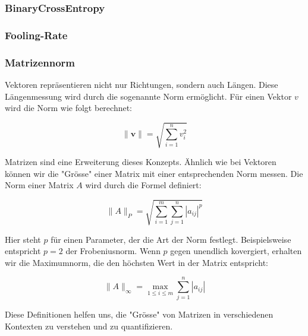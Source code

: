 \subsubsection{BinaryCrossEntropy}

\subsubsection{Fooling-Rate}

\subsubsection{Matrizennorm}
Vektoren repräsentieren nicht nur Richtungen, sondern auch Längen. Diese Längenmessung wird durch die sogenannte Norm ermöglicht. Für einen Vektor $v$ wird die Norm wie folgt berechnet:

\begin{equation}
    \| \mathbf{v} \| = \sqrt{\sum_{i=1}^{n} v_i^2}
\label{eq:Vektornorm}
\end{equation}

Matrizen sind eine Erweiterung dieses Konzepts. Ähnlich wie bei Vektoren können wir die "Grösse" einer Matrix mit einer entsprechenden Norm messen. Die Norm einer Matrix $A$ wird durch die Formel definiert:

\begin{equation}
    \| A \|_P = \sqrt{\sum_{i=1}^{m} \sum_{j=1}^{n} |a_{ij}|^p}
\label{eq:Matrixnorm}
\end{equation}

Hier steht $p$ für einen Parameter, der die Art der Norm festlegt. Beispielsweise entspricht $p=2$ der Frobeniusnorm. Wenn $p$ gegen unendlich kovergiert, erhalten wir die Maximumnorm, die den höchsten Wert in der Matrix entspricht:

\begin{equation}
    \|A\|_{\infty} = \max_{1 \leq i \leq m} \sum_{j=1}^{n} |a_{ij}|
    \label{eq:Maximumnorm}
\end{equation}

Diese Definitionen helfen uns, die "Grösse" von Matrizen in verschiedenen Kontexten zu verstehen und zu quantifizieren.